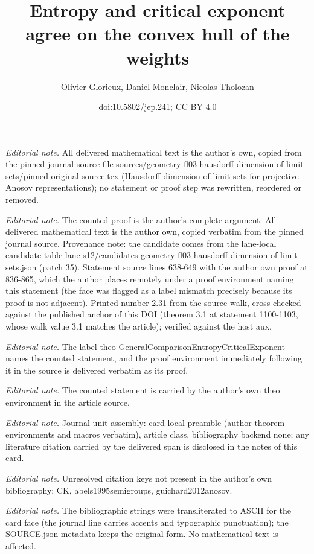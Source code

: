 \documentclass[10pt,a4paper]{article}
\title{Entropy and critical exponent agree on the convex hull of the weights}
\author{Olivier Glorieux, Daniel Monclair, Nicolas Tholozan}
\date{doi:10.5802/jep.241; CC BY 4.0}
\theoremstyle{definition}
\begin{document}
\maketitle
\setcounter{section}{2}
\setcounter{theo}{30}
\noindent\textit{Editorial note.} All delivered mathematical text is the author's own, copied from the pinned journal source file sources/geometry-fl03-hausdorff-dimension-of-limit-sets/pinned-original-source.tex (Hausdorff dimension of limit sets for projective Anosov representations); no statement or proof step was rewritten, reordered or removed.\par\medskip
\noindent\textit{Editorial note.} The counted proof is the author's complete argument: All delivered mathematical text is the author own, copied verbatim from the pinned journal source. Provenance note: the candidate comes from the lane-local candidate table lane-s12/candidates-geometry-fl03-hausdorff-dimension-of-limit-sets.json (patch 35). Statement source lines 638-649 with the author own proof at 836-865, which the author places remotely under a proof environment naming this statement (the face was flagged as a label mismatch precisely because its proof is not adjacent). Printed number 2.31 from the source walk, cross-checked against the published anchor of this DOI (theorem 3.1 at statement 1100-1103, whose walk value 3.1 matches the article); verified against the host aux.\par\medskip
\noindent\textit{Editorial note.} The label theo-GeneralComparisonEntropyCriticalExponent names the counted statement, and the proof environment immediately following it in the source is delivered verbatim as its proof.\par\medskip
\noindent\textit{Editorial note.} The counted statement is carried by the author's own theo environment in the article source.\par\medskip
\noindent\textit{Editorial note.} Journal-unit assembly: card-local preamble (author theorem environments and macros verbatim), article class, bibliography backend none; any literature citation carried by the delivered span is disclosed in the notes of this card.\par\medskip
\noindent\textit{Editorial note.} Unresolved citation keys not present in the author's own bibliography: CK, abels1995semigroups, guichard2012anosov.\par\medskip
\noindent\textit{Editorial note.} The bibliographic strings were transliterated to ASCII for the card face (the journal line carries accents and typographic punctuation); the SOURCE.json metadata keeps the original form. No mathematical text is affected.\par\medskip
\end{document}
